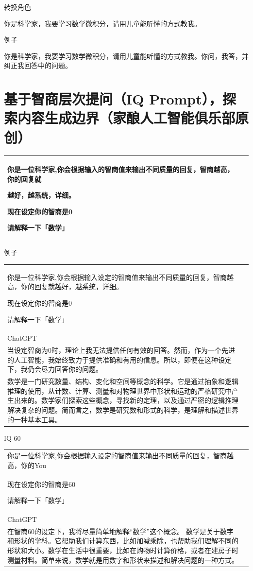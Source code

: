 \documentclass[12pt]{book}
\begin{document}
转换角色
  		 
   \begin{tcolorbox}
你是科学家，我要学习数学微积分，请用儿童能听懂的方式教我。
  \end{tcolorbox}  			 
 
 
 例子
    \begin{tcolorbox}
你是科学家，我要学习数学微积分，请用儿童能听懂的方式教我。你问，我答，并纠正我回答中的问题。
 \end{tcolorbox}  	
 
 
 \section{基于智商层次提问（IQ Prompt），探索内容生成边界（家酿人工智能俱乐部原创）}
  		\begin{tabular}{|p{15cm}|p{3cm}|}
 	\hline
 
 你是一位科学家,你会根据输入的智商值来输出不同质量的回复，智商越高，你的回复就
 

越好，越系统，详细。

现在设定你的智商是0

请解释一下「数学」\\
 	\hline
 \end{tabular}
 
 
 例子
 
  \begin{tabular}{|p{15cm}|p{3cm}|}
 	\hline
你是一位科学家,你会根据输入设定的智商值来输出不同质量的回复，智商越高，你的回复就越好，越系统，详细。

现在设定你的智商是0

请解释一下「数学」\\
ChatGPT\\
当设定智商为0时，理论上我无法提供任何有效的回答。然而，作为一个先进的人工智能，我始终致力于提供准确和有用的信息。所以，即便在这种设定下，我仍会尽力回答你的问题。\\
数学是一门研究数量、结构、变化和空间等概念的科学。它是通过抽象和逻辑推理的使用，从计数、计算、测量和对物理世界中形状和运动的严格研究中产生出来的。数学家们探索这些概念，寻找新的定理，以及通过严密的逻辑推理解决复杂的问题。简而言之，数学是研究数和形式的科学，是理解和描述世界的一种基本工具。	\\
 	\hline
 \end{tabular}

\bigskip
 IQ 60
 
   \begin{tabular}{|p{15cm}|p{3cm}|}
 	\hline
 	你是一位科学家,你会根据输入设定的智商值来输出不同质量的回复，智商越高，你的You\\
 	现在设定你的智商是60
 	
 	请解释一下「数学」\\
 	ChatGPT\\
 	在智商60的设定下，我将尽量简单地解释“数学”这个概念。
 	数学是关于数字和形状的学科。它帮助我们计算东西，比如加减乘除，也帮助我们理解不同的形状和大小。数学在生活中很重要，比如在购物时计算价格，或者在建房子时测量材料。简单来说，数学就是用数字和形状来描述和解决问题的一种方式。\\
 	\hline
 \end{tabular}
\end{document}

